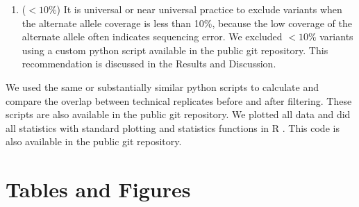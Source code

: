 \documentclass[11pt]{article} %
\begin{document}
\begin{enumerate}
\item ($<10\%$) It is universal or near universal practice to exclude variants when the alternate allele coverage is less than 10\%, because the low coverage of the alternate allele often indicates sequencing error. We excluded $<10\%$ variants using a custom python script available in the public git repository. This recommendation is discussed in the Results and Discussion.
\end{enumerate}

We used the same or substantially similar python scripts to calculate and compare the overlap between technical replicates before and after filtering. These scripts are also available in the public git repository. We plotted all data and did all statistics with standard plotting and statistics functions in R \citep{Rsoftware}. This code is also available in the public git repository.  





\section*{Tables and Figures}
\end{document}
